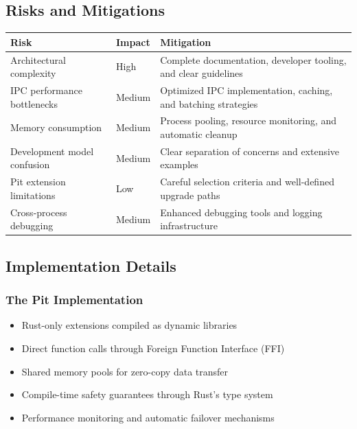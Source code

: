 \subsection*{Risks and Mitigations}

\begin{center}
\begin{tabular}{@{}p{4cm}p{2cm}p{6cm}@{}}
\toprule
\textbf{Risk} & \textbf{Impact} & \textbf{Mitigation} \\
\midrule
Architectural complexity & High & Complete documentation, developer tooling, and clear guidelines \\
IPC performance bottlenecks & Medium & Optimized IPC implementation, caching, and batching strategies \\
Memory consumption & Medium & Process pooling, resource monitoring, and automatic cleanup \\
Development model confusion & Medium & Clear separation of concerns and extensive examples \\
Pit extension limitations & Low & Careful selection criteria and well-defined upgrade paths \\
Cross-process debugging & Medium & Enhanced debugging tools and logging infrastructure \\
\bottomrule
\end{tabular}
\end{center}

\subsection*{Implementation Details}

\subsubsection*{The Pit Implementation}
\begin{itemize}
\item Rust-only extensions compiled as dynamic libraries
\item Direct function calls through Foreign Function Interface (FFI)
\item Shared memory pools for zero-copy data transfer
\item Compile-time safety guarantees through Rust's type system
\item Performance monitoring and automatic failover mechanisms
\end{itemize}

